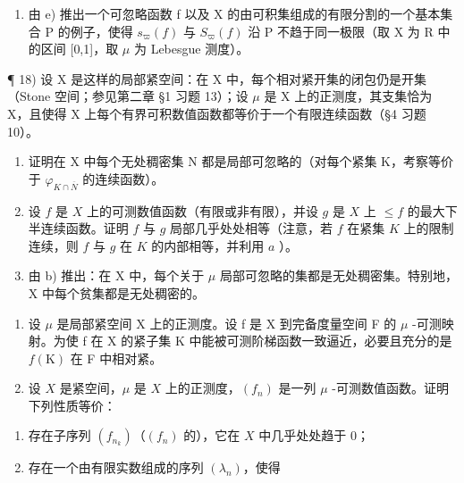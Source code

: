 \begin{enumerate}
  设 \(\mathcal{P}\) 是 \(X\) 的由可积集组成的有限分割的一个基本集合，使得每个分割 \(\varpi \in \mathcal{P}\) 都由开集与可忽略集组成。对每个有界函数 \(f\)（\(X\) 上），设 \(g\) 是 \(X\) 上 \(\leqslant f\) 的最大下半连续函数（GT, IV, §6, 命题 4）；证明对每个分割 \(\varpi \in \mathcal{P}\)，有 \(s_{\varpi}(f) = s_{\varpi}(g)\)。由此推出，为使 \(s_{\varpi}(f)\) 与 \(S_{\varpi}(f)\) 沿 \(\mathcal{P}\) 趋于一个公共极限，必须 \(f\) 在 \(X\) 中几乎处处连续。
\item
  由 e) 推出一个可忽略函数 f 以及 X 的由可积集组成的有限分割的一个基本集合 P 的例子，使得 \(s_{\varpi}(f)\) 与 \(S_{\varpi}(f)\) 沿 P 不趋于同一极限（取 X 为 R 中的区间 {[}0,1{]}，取 \(\mu\) 为 Lebesgue 测度）。
\end{enumerate}

¶ 18) 设 X 是这样的局部紧空间：在 X 中，每个相对紧开集的闭包仍是开集（Stone 空间；参见第二章 §1 习题 13）；设 \(\mu\) 是 X 上的正测度，其支集恰为 X，且使得 X 上每个有界可积数值函数都等价于一个有限连续函数（§4 习题 10）。

\begin{enumerate}
\def\labelenumi{\alph{enumi})}
\item
  证明在 X 中每个无处稠密集 N 都是局部可忽略的（对每个紧集 K，考察等价于 \(\varphi_{K\cap \overline{N}}\) 的连续函数）。
\item
  设 \(f\) 是 \(X\) 上的可测数值函数（有限或非有限），并设 \(g\) 是 \(X\) 上 \(\leqslant f\) 的最大下半连续函数。证明 \(f\) 与 \(g\) 局部几乎处处相等（注意，若 \(f\) 在紧集 \(K\) 上的限制连续，则 \(f\) 与 \(g\) 在 \(K\) 的内部相等，并利用 \(a\) ）。
\item
  由 b) 推出：在 X 中，每个关于 \(\mu\) 局部可忽略的集都是无处稠密集。特别地，X 中每个贫集都是无处稠密的。
\end{enumerate}

\begin{enumerate}
\def\labelenumi{\arabic{enumi})}
\setcounter{enumi}{18}
\item
  设 \(\mu\) 是局部紧空间 X 上的正测度。设 f 是 X 到完备度量空间 F 的 \(\mu\) -可测映射。为使 f 在 X 的紧子集 K 中能被可测阶梯函数一致逼近，必要且充分的是 \(f(\mathrm{K})\) 在 F 中相对紧。
\item
  设 \(X\) 是紧空间，\(\mu\) 是 \(X\) 上的正测度，\((f_n)\) 是一列 \(\mu\) -可测数值函数。证明下列性质等价：
\end{enumerate}

\begin{enumerate}
\def\labelenumi{(\roman{enumi})}
\item
  存在子序列 \((f_{n_k})\)（\((f_n)\) 的），它在 \(X\) 中几乎处处趋于 0；
\item
  存在一个由有限实数组成的序列 \((\lambda_{n})\)，使得
\end{enumerate}

